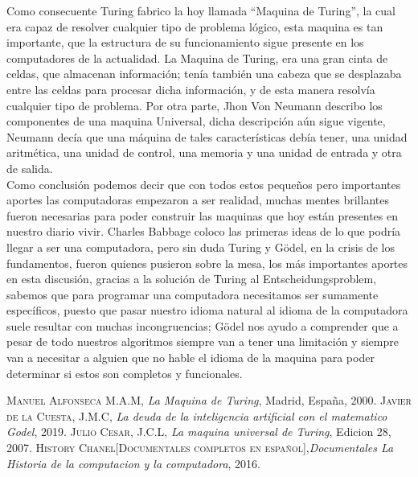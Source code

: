 \documentclass{article}
\begin{document}
Como consecuente Turing fabrico la hoy llamada “Maquina de Turing”, la cual era capaz de resolver cualquier tipo de problema lógico, esta maquina es tan importante, que la estructura de su funcionamiento sigue presente en los computadores de la actualidad. La Maquina de Turing, era una gran cinta de celdas, que almacenan información; tenía también una cabeza que se desplazaba entre las celdas para procesar dicha información, y de esta manera resolvía cualquier tipo de problema. Por otra parte, Jhon Von Neumann describo los componentes de una maquina Universal, dicha descripción aún sigue vigente, Neumann decía que una máquina de tales características debía tener, una unidad aritmética, una unidad de control, una memoria y una unidad de entrada y otra de salida.\\

Como conclusión podemos decir que con todos estos pequeños pero importantes aportes las computadoras empezaron a ser realidad, muchas mentes brillantes fueron necesarias para poder construir las maquinas que hoy están presentes en nuestro diario vivir. Charles Babbage coloco las primeras ideas de lo que podría llegar a ser una computadora, pero sin duda Turing y Gödel, en la crisis de los fundamentos, fueron quienes pusieron sobre la mesa, los más importantes aportes en esta discusión, gracias a la solución de Turing al Entscheidungsproblem, sabemos que para programar una computadora necesitamos ser sumamente específicos, puesto que pasar nuestro idioma natural al idioma de la computadora suele resultar con muchas incongruencias; Gödel nos ayudo a comprender que a pesar de todo nuestros algoritmos siempre van a tener una limitación y siempre van a necesitar a alguien que no hable el idioma de la maquina para poder determinar si estos son completos y funcionales.

\newpage


\begin{thebibliography}{X}
 \textsc{Manuel Alfonseca M.A.M},
\textit{La Maquina de Turing}, Madrid, España, 2000.
 \textsc{Javier de la Cuesta, J.M.C},\textit{ La deuda de la inteligencia artificial con el matematico Godel}, 2019.
 \textsc{Julio Cesar, J.C.L},\textit{ La maquina universal de Turing}, Edicion 28, 2007.
 \textsc{History Chanel[Documentales completos en español]},\textit{Documentales La Historia de la computacion y la computadora}, 2016.
\end{thebibliography}
\end{document}
